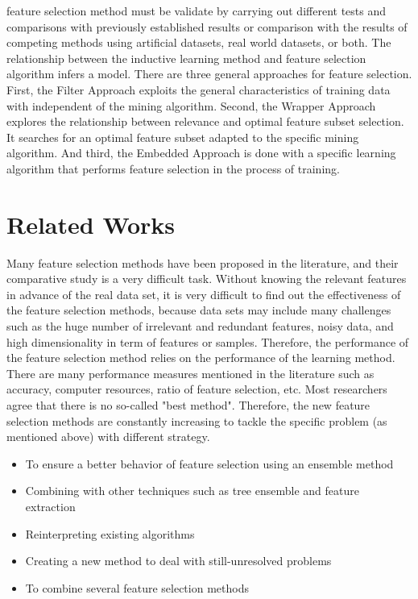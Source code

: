 \documentclass[document.tex]{subfiles}
\begin{document}
feature selection method must be validate by carrying out different tests and comparisons
with previously established results or comparison with the results of competing methods
using artificial datasets, real world datasets, or both.
The relationship between the inductive learning method and feature selection algorithm
infers a model. There are three general approaches for feature selection. First, the Filter
Approach exploits the general characteristics of training data with independent of the
mining algorithm. Second, the Wrapper Approach explores the relationship between
relevance and optimal feature subset selection\cite{12}. It searches for an optimal feature subset
adapted to the specific mining algorithm. And third, the Embedded Approach is
done with a specific learning algorithm that performs feature selection in the process of
training.
\section{Related Works}
\noindent Many feature selection methods have been proposed in the literature, and their comparative study is a very difficult task. Without knowing the relevant features in advance of
the real data set, it is very difficult to find out the effectiveness of the feature selection
methods, because data sets may include many challenges such as the huge number of irrelevant and redundant features, noisy data, and high dimensionality in term of features
or samples. Therefore, the performance of the feature selection method relies on the performance of the learning method. There are many performance measures mentioned in
the literature such as accuracy, computer resources, ratio of feature selection, etc. Most
researchers agree that there is no so-called "best method". Therefore, the new feature
selection methods are constantly increasing to tackle the specific problem (as mentioned
above) with different strategy.
\begin{itemize}
	\item To ensure a better behavior of feature selection using an ensemble method
	\item Combining with other techniques such as tree ensemble and feature extraction\cite{4}
	\item Reinterpreting existing algorithms
	\item Creating a new method to deal with still-unresolved problems
	\item To combine several feature selection methods
\end{itemize}
\end{document}
